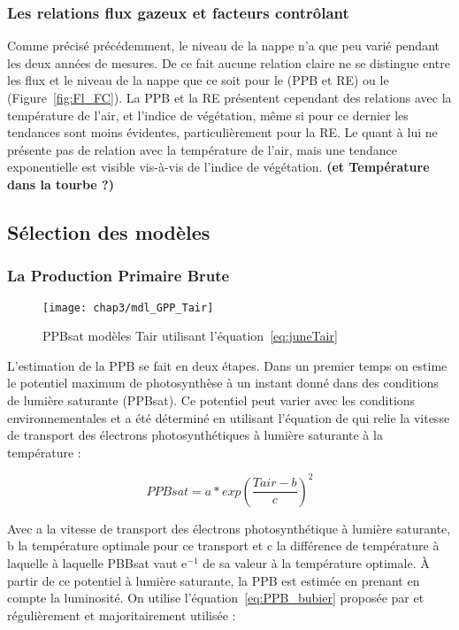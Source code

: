 \subsubsection{Les relations flux gazeux et facteurs contrôlant}

Comme précisé précédemment, le niveau de la nappe n'a que peu varié pendant les deux années de mesures.
De ce fait aucune relation claire ne se distingue entre les flux et le niveau de la nappe que ce soit pour le \coo (PPB et RE) ou le \chh (Figure~\ref{fig:Fl_FC}).
La PPB et la RE présentent cependant des relations avec la température de l'air, et l'indice de végétation, même si pour ce dernier les tendances sont moins évidentes, particulièrement pour la RE.
Le \chh quant à lui ne présente pas de relation avec la température de l'air, mais une tendance exponentielle est visible vis-à-vis de l'indice de végétation.
\textbf{(\chh et Température dans la tourbe ?)}

\subsection{Sélection des modèles}

\subsubsection{La Production Primaire Brute}

\begin{figure}
\centering
\texttt{[image: chap3/mdl\_GPP\_Tair]}
\caption{PPBsat modèles Tair utilisant l'équation~\ref{eq:juneTair}}
\label{fig:mdl_GPP_Tair}
\end{figure}

L'estimation de la PPB se fait en deux étapes.
Dans un premier temps on estime le potentiel maximum de photosynthèse à un instant donné dans des conditions de lumière saturante (PPBsat).
Ce potentiel peut varier avec les conditions environnementales et a été déterminé en utilisant l'équation de \citep{june2004} qui relie la vitesse de transport des électrons photosynthétiques à lumière saturante à la température :

\begin{equation}\label{eq:juneTair}
PPBsat = a * exp(\frac{Tair - b}{c})^2
\end{equation}

Avec a la vitesse de transport des électrons photosynthétique à lumière saturante, b la température optimale pour ce transport et c la différence de température à laquelle à laquelle PBBsat vaut e$^{-1}$ de sa valeur à la température optimale.
À partir de ce potentiel à lumière saturante, la PPB est estimée en prenant en compte la luminosité.
On utilise l'équation~\ref{eq:PPB_bubier} proposée par \citep{bubier1998} et régulièrement et majoritairement utilisée \citep{bortoluzzi2006,worrall2009}:

